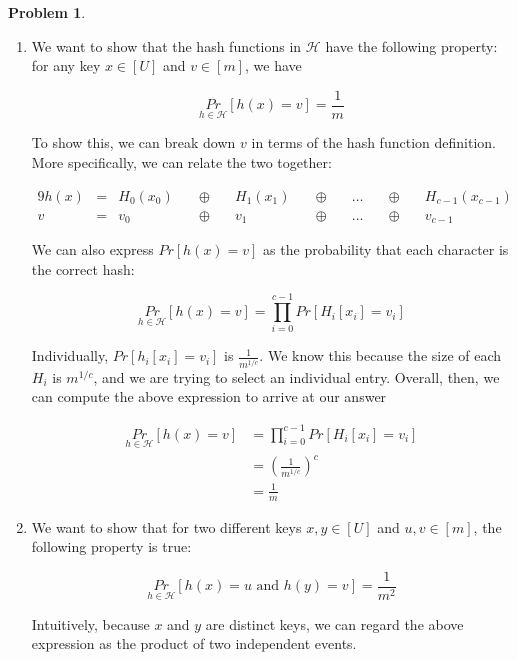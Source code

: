 \documentclass[11pt]{article}
\theoremstyle{definition}
\theoremstyle{case}
\theoremstyle{theorem}
\newtheorem{prob}{Problem}
\begin{document}
\begin{prob}\end{prob}

\begin{enumerate}[label=(\alph*)]

\item We want to show that the hash functions in $\mathcal{H}$ have the following
property: for any key $x \in [U]$ and $v \in [m]$, we have

\[
  \underset{h \in \mathcal{H}}{Pr}[ h(x) = v ] = \frac{1}{m}
\]

To show this, we can break down $v$ in terms of the hash function definition. More
specifically, we can relate the two together:

\begin{alignat}{9}
  h(x) &= &H_0(x_0) \quad &\oplus \quad &H_1(x_1) \quad &\oplus \quad &\hdots \quad &\oplus \quad &H_{c - 1}(x_{c - 1}) \\
     v &= &v_0      \quad &\oplus \quad &v_1      \quad &\oplus \quad &\hdots \quad &\oplus \quad &v_{c - 1}
\end{alignat}

We can also express $Pr[h(x) = v]$ as the probability that each character is the 
correct hash:

\[
  \underset{h \in \mathcal{H}}{Pr}[ h(x) = v ] = \prod_{i = 0}^{c - 1} Pr[H_i[x_i] = v_i]
\]

Individually, $Pr[h_i[x_i] = v_i]$ is $\frac{1}{m^{1/c}}$. We know this because the size of 
each $H_i$ is $m^{1/c}$, and we are trying to select an individual entry. Overall, then,
we can compute the above expression to arrive at our answer

\begin{align*}
  \underset{h \in \mathcal{H}}{Pr}[ h(x) = v ] &= \prod_{i = 0}^{c - 1} Pr[H_i[x_i] = v_i] \\
                                               &= (\frac{1}{m^{1/c}})^{c} \\
                                               &= \frac{1}{m}
\end{align*}

\item We want to show that for two different keys $x, y \in [U]$ and $u, v \in [m]$, the 
following property is true:

\[
  \underset{h \in \mathcal{H}}{Pr}[ h(x) = u \text{ and } h(y) = v ] = \frac{1}{m^2}
\]

Intuitively, because $x$ and $y$ are distinct keys, we can regard the above expression 
as the product of two independent events.


\end{enumerate}
\end{document}
